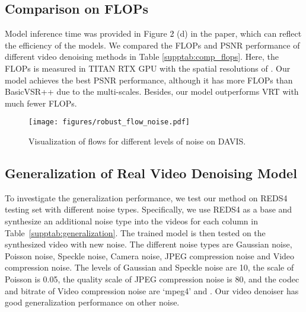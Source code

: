 \documentclass[10pt,twocolumn,letterpaper]{article}
\def\red{\textcolor{black}}
\newlength \g
\begin{document}
\subsection{Comparison on FLOPs}

Model inference time was provided in Figure \red{2} (d) in the paper, which can reflect the efficiency of the models. We compared the FLOPs and PSNR performance of different video denoising methods in Table \ref{supptab:comp_flops}. Here, the FLOPs is measured in TITAN RTX GPU with the spatial resolutions of . Our model achieves the best PSNR performance, although it has more FLOPs than BasicVSR++ \cite{chan2021basicvsrpp} due to the multi-scales. Besides, our model outperforms VRT \cite{liang2022vrt} with much fewer FLOPs. 

\begin{table}[h]
\vspace{-5pt}
\caption{Comparison with different methods on FLOPs.}
\label{supptab:comp_flops}
\centering
{}
\vspace{-5pt}
\end{table}

\begin{figure*}[t]
    \begin{center}
\texttt{[image: figures/robust\_flow\_noise.pdf]}
    \end{center}
    \vspace{-3mm}
    \caption{Visualization of flows for different levels of noise on DAVIS.}
    \label{fig:robust_flow_noise}
\end{figure*}

\subsection{Generalization of Real Video Denoising Model}
To investigate the generalization performance, we test our method on REDS4 testing set with different noise types.
Specifically, we use REDS4 as a base and synthesize an additional noise type into the videos for each column in Table~\ref{supptab:generalization}. The trained model is then tested on the synthesized video with new noise. The different noise types are Gaussian noise, Poisson noise, Speckle noise, Camera noise, JPEG compression noise and Video compression noise. The levels of Gaussian and Speckle noise are 10, the scale of Poisson is 0.05, the quality scale of JPEG compression noise is 80, and the codec and bitrate of Video compression noise are `mpeg4' and .
Our video denoiser has good generalization performance on other noise.
\end{document}
